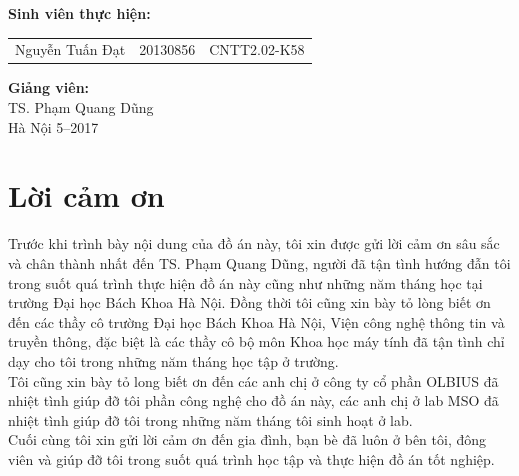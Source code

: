 \documentclass[a4paper,12pt]{report}
\renewcommand{\contentsname}{Mục lục}
\begin{document}
\begin{center}
\hspace{-5cm}\fontsize{14}{16}\selectfont \textbf{Sinh viên thực hiện:}\\[0.1cm] 
\begin{longtable}{l c c}
Nguyễn Tuấn Đạt & 20130856 & CNTT2.02-K58 
\end{longtable}
\vspace{0.5cm}
\hspace{-8.5cm}\fontsize{14}{16}\selectfont \textbf{Giảng viên:}\\[0.1cm]
\hspace{-2.7cm}\fontsize{14}{16}\selectfont TS. Phạm Quang Dũng \\[3cm]
\fontsize{16}{19}\selectfont Hà Nội 5--2017
\end{center}
\chapter*{Lời cảm ơn}
Trước khi trình bày nội dung của đồ án này, tôi xin được gửi lời cảm ơn sâu sắc và chân thành nhất đến TS. Phạm Quang Dũng, người đã tận tình hướng đẫn tôi trong suốt quá trình thực hiện đồ án này cũng như những năm tháng học tại trường Đại học Bách Khoa Hà Nội. Đồng thời tôi cũng xin bày tỏ lòng biết ơn đến các thầy cô trường Đại học Bách Khoa Hà Nội, Viện công nghệ thông tin và truyền thông, đặc biệt là các thầy cô bộ môn Khoa học máy tính đã tận tình chỉ dạy cho tôi trong những năm tháng học tập ở trường. \\ 

Tôi cũng xin bày tỏ long biết ơn đến các anh chị ở công ty cổ phần OLBIUS đã nhiệt tình giúp đỡ tôi phần công nghệ cho đồ án này, các anh chị ở lab MSO đã nhiệt tình giúp đỡ tôi trong những năm tháng tôi sinh hoạt ở lab.\\

Cuối cùng tôi xin gửi lời cảm ơn đến gia đình, bạn bè đã luôn ở bên tôi, đông viên và giúp đỡ tôi trong suốt quá trình học tập và thực hiện đồ án tốt nghiệp. 
\newpage
\pdfbookmark{\contentsname}{toc}

\tableofcontents
\newpage
\printacronyms[include-classes=abbrev,name=Bảng chữ viết tắt]

\printacronyms[include-classes=nomencl,name=Danh mục]
\listoffigures
\end{document}
